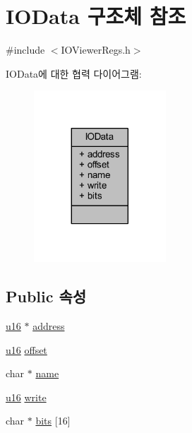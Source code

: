 \hypertarget{struct_i_o_data}{}\section{I\+O\+Data 구조체 참조}
\label{struct_i_o_data}


{\ttfamily \#include $<$I\+O\+Viewer\+Regs.\+h$>$}



I\+O\+Data에 대한 협력 다이어그램\+:\nopagebreak
\begin{figure}[H]
\begin{center}
\leavevmode
\includegraphics[width=140pt]{struct_i_o_data__coll__graph}
\end{center}
\end{figure}
\subsection*{Public 속성}
\begin{DoxyCompactItemize}
\item 
\mbox{\hyperlink{_system_8h_a9e6c91d77e24643b888dbd1a1a590054}{u16}} $\ast$ \mbox{\hyperlink{struct_i_o_data_a5fcb4807916458a82aef9ed9b51a175e}{address}}
\item 
\mbox{\hyperlink{_system_8h_a9e6c91d77e24643b888dbd1a1a590054}{u16}} \mbox{\hyperlink{struct_i_o_data_a233a9f32b3427e87b64dc90fe22f9b02}{offset}}
\item 
char $\ast$ \mbox{\hyperlink{struct_i_o_data_ae8309728b994911239463cf8eabbfe17}{name}}
\item 
\mbox{\hyperlink{_system_8h_a9e6c91d77e24643b888dbd1a1a590054}{u16}} \mbox{\hyperlink{struct_i_o_data_a63aed2fbb67f748415d947e0c403ef2c}{write}}
\item 
char $\ast$ \mbox{\hyperlink{struct_i_o_data_a31e899a3963226dc851ee4dc9f92a0c1}{bits}} \mbox{[}16\mbox{]}
\end{DoxyCompactItemize}


